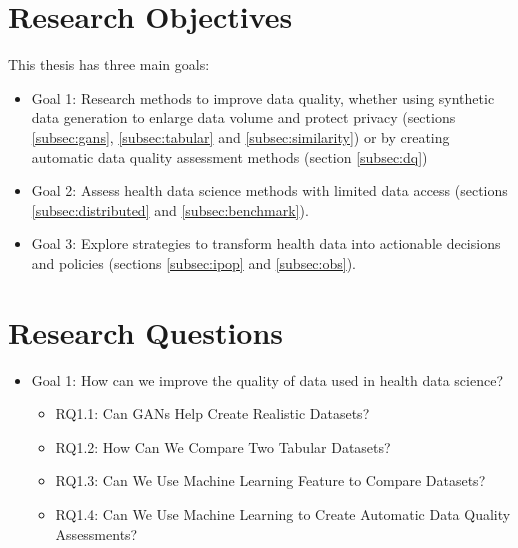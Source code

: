 
\section{Research Objectives}
This thesis has three main goals:


\begin{itemize}
    \item Goal 1: Research methods to improve data quality, whether using synthetic data generation to enlarge data volume and protect privacy (sections \ref{subsec:gans}, \ref{subsec:tabular} and \ref{subsec:similarity}) or by creating automatic data quality assessment methods (section \ref{subsec:dq})

    \item Goal 2: Assess health data science  methods with limited data access (sections \ref{subsec:distributed} and \ref{subsec:benchmark}).

    \item Goal 3: Explore strategies to transform health data into actionable decisions and policies (sections  \ref{subsec:ipop} and \ref{subsec:obs}).
\end{itemize}


\section{Research Questions}

\begin{itemize}
    \item Goal 1: How can we improve the quality of data used in health data science?
    \begin{itemize}
        \item RQ1.1: Can GANs Help Create Realistic Datasets?
        \item RQ1.2: How Can We Compare Two Tabular Datasets?
        \item RQ1.3: Can We Use Machine Learning Feature to Compare Datasets?
        \item RQ1.4: Can We Use Machine Learning to Create Automatic Data Quality Assessments?
    \end{itemize}
\end{itemize}

